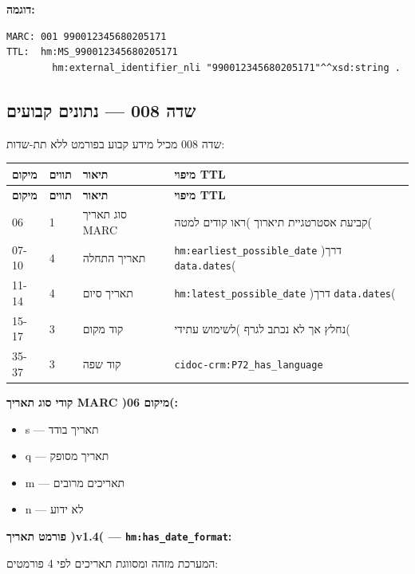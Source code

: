 \documentclass[12pt,a4paper]{article}
\newcommand{\ttlprop}[1]{\texttt{#1}}
\begin{document}
\textbf{דוגמה:}
\begin{LTR}
\begin{verbatim}
MARC: 001 990012345680205171
TTL:  hm:MS_990012345680205171 
        hm:external_identifier_nli "990012345680205171"^^xsd:string .
\end{verbatim}
\end{LTR}

\subsection{שדה 008 — נתונים קבועים}

שדה 008 מכיל מידע קבוע בפורמט ללא תת-שדות:

\begin{longtable}{|L{2cm}|L{2cm}|p{4cm}|L{8cm}|}
\hline
\textbf{מיקום} & \textbf{תווים} & \textbf{תיאור} & \textbf{מיפוי TTL} \\
\hline
\endfirsthead
\hline
\textbf{מיקום} & \textbf{תווים} & \textbf{תיאור} & \textbf{מיפוי TTL} \\
\hline
\endhead
\hline
\endfoot
\textenglish{06} & 1 & סוג תאריך MARC & קביעת אסטרטגיית תיארוך )ראו קודים למטה( \\
\hline
\textenglish{07-10} & 4 & תאריך התחלה & \ttlprop{hm:earliest\_possible\_date} )דרך \ttlprop{data.dates}( \\
\hline
\textenglish{11-14} & 4 & תאריך סיום & \ttlprop{hm:latest\_possible\_date} )דרך \ttlprop{data.dates}( \\
\hline
\textenglish{15-17} & 3 & קוד מקום & נחלץ אך לא נכתב לגרף )לשימוש עתידי( \\
\hline
\textenglish{35-37} & 3 & קוד שפה & \ttlprop{cidoc-crm:P72\_has\_language} \\
\hline
\end{longtable}

\textbf{קודי סוג תאריך MARC )מיקום 06(:}
\begin{itemize}
\item \textenglish{s} — תאריך בודד
\item \textenglish{q} — תאריך מסופק
\item \textenglish{m} — תאריכים מרובים
\item \textenglish{n} — לא ידוע
\end{itemize}

\textbf{פורמט תאריך )v1.4( — \ttlprop{hm:has\_date\_format}:}

המערכת מזהה ומסווגת תאריכים לפי 4 פורמטים:
\end{document}
